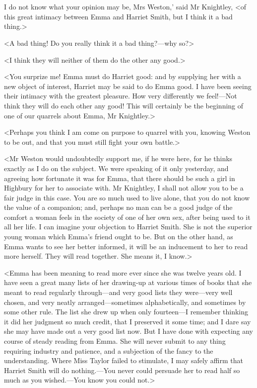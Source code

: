 \chapter[Chapter \thechapter]{}
	
\lettrine[lraise=0.3,ante=`]{I}{} do not know what your opinion may be, Mrs Weston,' said Mr Knightley, <of this great intimacy between Emma and Harriet Smith, but I think it a bad thing.>

\zz
<A bad thing! Do you really think it a bad thing?—why so?>

<I think they will neither of them do the other any good.>

<You surprize me! Emma must do Harriet good: and by supplying her with a new object of interest, Harriet may be said to do Emma good. I have been seeing their intimacy with the greatest pleasure. How very differently we feel!—Not think they will do each other any good! This will certainly be the beginning of one of our quarrels about Emma, Mr Knightley.>

<Perhaps you think I am come on purpose to quarrel with you, knowing Weston to be out, and that you must still fight your own battle.>

<Mr Weston would undoubtedly support me, if he were here, for he thinks exactly as I do on the subject. We were speaking of it only yesterday, and agreeing how fortunate it was for Emma, that there should be such a girl in Highbury for her to associate with. Mr Knightley, I shall not allow you to be a fair judge in this case. You are so much used to live alone, that you do not know the value of a companion; and, perhaps no man can be a good judge of the comfort a woman feels in the society of one of her own sex, after being used to it all her life. I can imagine your objection to Harriet Smith. She is not the superior young woman which Emma's friend ought to be. But on the other hand, as Emma wants to see her better informed, it will be an inducement to her to read more herself. They will read together. She means it, I know.>

<Emma has been meaning to read more ever since she was twelve years old. I have seen a great many lists of her drawing-up at various times of books that she meant to read regularly through—and very good lists they were—very well chosen, and very neatly arranged—sometimes alphabetically, and sometimes by some other rule. The list she drew up when only fourteen—I remember thinking it did her judgment so much credit, that I preserved it some time; and I dare say she may have made out a very good list now. But I have done with expecting any course of steady reading from Emma. She will never submit to any thing requiring industry and patience, and a subjection of the fancy to the understanding. Where Miss Taylor failed to stimulate, I may safely affirm that Harriet Smith will do nothing.—You never could persuade her to read half so much as you wished.—You know you could not.>

